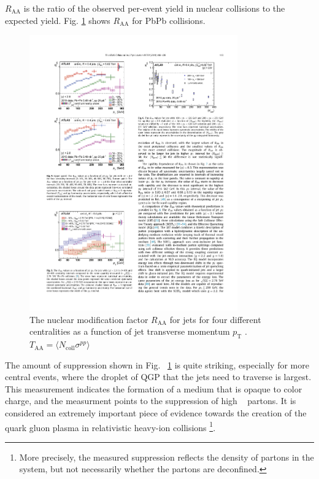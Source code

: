   $R_\mathrm{AA}$ is the ratio of the observed per-event yield in nuclear collisions to the expected yield. Fig. \ref{fig:atlas_raa} shows $R_\mathrm{AA}$ for PbPb collisions.
  \begin{figure}[htpb]
    \centering
    \includegraphics[width=0.8\textwidth]{Introduction/atlas_raa.pdf}
    \caption{The nuclear modification factor $R_\mathrm{AA}$ for jets for four different centralities as a function of jet transverse momentum $p_\mathrm{T}$ \cite{Aaboud2019}. $T_\mathrm{AA} = \langle N_\mathrm{coll}\sigma^{pp}\rangle$}
    \label{fig:atlas_raa}
  \end{figure}
  The amount of suppression shown in Fig. ~\ref{fig:atlas_raa} is quite striking, especially for more central events, where the droplet of QGP that the jets need to traverse is largest. This measurement indicates the formation of a medium that is opaque to color charge, and the measurment points to the suppression of high \pT~ partons. It is considered an extremely important piece of evidence towards the creation of the quark gluon plasma in relativistic heavy-ion collisions \footnote{More precisely, the measured suppression reflects the density of partons in the system, but not necessarily whether the partons are deconfined.}. 

